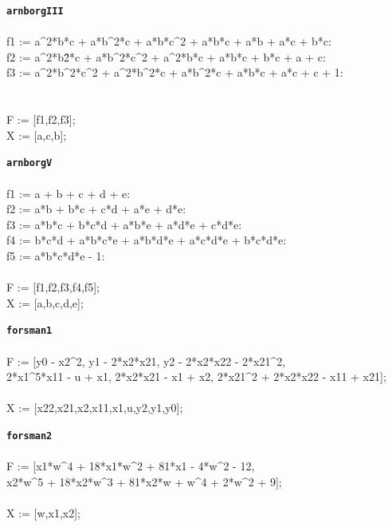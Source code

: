 \documentclass[letterpaper,12pt,titlepage,oneside,final]{book}
\newenvironment{codefont}{\footnotesize\ttfamily}{\par}
\begin{document}
\begin{appendices}
\noindent\textbf{\texttt{arnborgIII}}\\\\
\noindent\begin{codefont}
  f1 := a\^{}2*b*c + a*b\^{}2*c + a*b*c\^{}2 + a*b*c + a*b + a*c + b*c:
  \\f2 := a\^{}2*b\^2*c + a*b\^{}2*c\^{}2 + a\^{}2*b*c + a*b*c + b*c + a + c:
  \\f3 := a\^{}2*b\^{}2*c\^{}2 + a\^{}2*b\^{}2*c + a*b\^{}2*c + a*b*c + a*c + c + 1:\\
  \\
  \\F := [f1,f2,f3];
  \\X := [a,c,b];\\
\end{codefont}

\noindent\textbf{\texttt{arnborgV}}\\\\
\noindent\begin{codefont}
  f1 := a + b + c + d + e:\\
  f2 := a*b + b*c + c*d + a*e + d*e:\\
  f3 := a*b*c + b*c*d + a*b*e + a*d*e + c*d*e:\\
  f4 := b*c*d + a*b*c*e + a*b*d*e + a*c*d*e + b*c*d*e:\\
  f5 := a*b*c*d*e - 1:\\
  \\
  F := [f1,f2,f3,f4,f5];\\
  X := [a,b,c,d,e];\\
\end{codefont}

\noindent\textbf{\texttt{forsman1}}\\\\
\noindent\begin{codefont}
  F := [y0 - x2\^{}2, y1 - 2*x2*x21, y2 - 2*x2*x22 - 2*x21\^{}2,\\
      2*x1\^{}5*x11 - u + x1, 2*x2*x21 - x1 + x2, 2*x21\^{}2 + 2*x2*x22 - x11 + x21];\\
  \\
  X := [x22,x21,x2,x11,x1,u,y2,y1,y0];\\
\end{codefont}

\noindent\textbf{\texttt{forsman2}}\\\\
\noindent\begin{codefont}
  F := [x1*w\^{}4 + 18*x1*w\^{}2 + 81*x1 - 4*w\^{}2 - 12,\\
      x2*w\^{}5 + 18*x2*w\^{}3 + 81*x2*w + w\^{}4 + 2*w\^{}2 + 9];\\
  \\
  X := [w,x1,x2];\\
\end{codefont}


\end{appendices}
\end{document}
